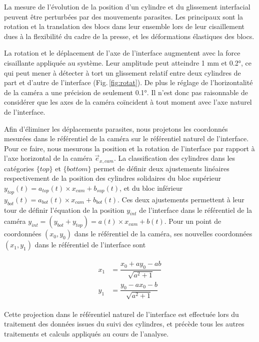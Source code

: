 La mesure de l'évolution de la position d'un cylindre et du glissement interfacial peuvent être perturbées par des mouvements parasites. Les principaux sont la rotation et la translation des blocs dans leur ensemble lors de leur cisaillement dues à la flexibilité du cadre de la presse, et les déformations élastiques des blocs.



La rotation et le déplacement de l'axe de l'interface augmentent avec la force cisaillante appliquée au système. Leur amplitude peut atteindre 1 mm et \ang{0.2}, ce qui peut mener à détecter à tort un glissement relatif entre deux cylindres de part et d'autre de l'interface (Fig.\,\ref{fig:rotat}). De plus le réglage de l'horizontalité de la caméra a une précision de seulement \ang{0.1}. Il n'est donc pas raisonnable de considérer que les axes de la caméra coïncident à tout moment avec l'axe naturel de l'interface.

Afin d'éliminer les déplacements parasites, nous projetons les coordonnés mesurées dans le référentiel de la caméra sur le référentiel naturel de l'interface. Pour ce faire, nous mesurons la position et la rotation de l'interface par rapport à l'axe horizontal de la caméra $\vec{e}_{x,cam}$. La classification des cylindres dans les catégories $\{top\}$ et $\{bottom\}$ permet de définir deux ajustements linéaires respectivement de la position des cylindres solidaires du bloc supérieur $y_{top}(t)=a_{top}(t)\times x_{cam}+b_{sup}(t)$, et du bloc inférieur $y_{bot}(t)=a_{bot}(t)\times x_{cam}+b_{bot} (t)$. Ces deux ajustements permettent à leur tour de définir l'équation de la position $y_{int}$ de l'interface dans le référentiel de la caméra $y_{int} = (y_{bot}+y_{top}) = a(t) \times x_{cam} + b(t)$. Pour un point de coordonnées $(x_0,y_0)$ dans le référentiel de la caméra, ses nouvelles coordonnées $(x_1,y_1)$ dans le référentiel de l'interface sont


\begin{align}[left=\empheqlbrace]
\begin{split}
x_1&= \dfrac{x_0+ay_0-a b}{\sqrt{a^2+1}} \\
y_1&= \dfrac{y_0-a x_0-b}{\sqrt{a^2+1}}
\end{split}
\end{align}

Cette projection dans le référentiel naturel de l'interface est effectuée lors du traitement des données issues du suivi des cylindres, et précède tous les autres traitements et calculs appliqués au cours de l'analyse.

